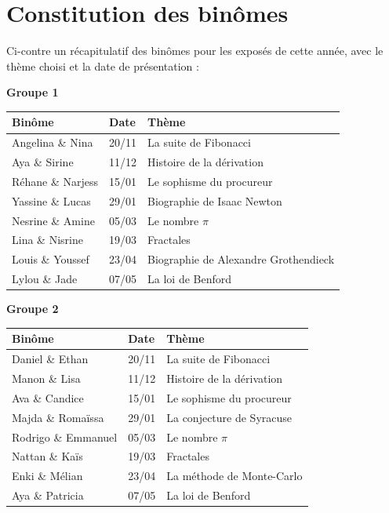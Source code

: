 \documentclass[oneside,12pt]{article}          %
\begin{document}
\section{Constitution des binômes}
Ci-contre un récapitulatif des binômes pour les exposés de cette année, avec le thème choisi et la date de présentation :

\begin{minipage}{0.43\textwidth}
	\begin{center}
		\textbf{Groupe 1}
	\end{center}
	
	\renewcommand{\arraystretch}{1.9}
	\begin{tabular}{| P{0.3\textwidth} | P{0.2\textwidth} | P{0.5\textwidth} |} \hline
		\textbf{Binôme} & \textbf{Date} & \textbf{Thème} \\ \hline
		Angelina \& Nina & 20/11 & La suite de Fibonacci \\ \hline
		Aya \& Sirine & 11/12 & Histoire de la dérivation \\ \hline
		Réhane \& Narjess & 15/01 & Le sophisme du procureur \\ \hline
		Yassine \& Lucas & 29/01 & Biographie de Isaac Newton \\ \hline
		Nesrine \& Amine & 05/03 & Le nombre $\pi$ \\ \hline
		Lina \& Nisrine & 19/03 & Fractales \\ \hline
		Louis \& Youssef & 23/04 & Biographie de Alexandre Grothendieck \\ \hline
		Lylou \& Jade & 07/05 & La loi de Benford\\ \hline
	\end{tabular}
\end{minipage} \hspace{15mm}
\begin{minipage}{0.43\textwidth}
	\begin{center}
		\textbf{Groupe 2}
	\end{center}
	
	\renewcommand{\arraystretch}{2}
	\begin{tabular}{| P{0.3\textwidth} | P{0.2\textwidth} | P{0.5\textwidth} |} \hline
		\textbf{Binôme} & \textbf{Date} & \textbf{Thème} \\ \hline
		Daniel \& Ethan & 20/11 & La suite de Fibonacci \\ \hline
		Manon \& Lisa & 11/12 & Histoire de la dérivation \\ \hline
		Ava \& Candice & 15/01 & Le sophisme du procureur \\ \hline
		Majda \& Romaïssa & 29/01 & La conjecture de Syracuse \\ \hline
		Rodrigo \& Emmanuel & 05/03 & Le nombre $\pi$ \\ \hline
		Nattan \& Kaïs & 19/03 & Fractales \\ \hline
		Enki \& Mélian & 23/04 & La méthode de Monte-Carlo \\ \hline
		Aya \& Patricia & 07/05 & La loi de Benford \\ \hline
 	\end{tabular}
\end{minipage}
\end{document}
